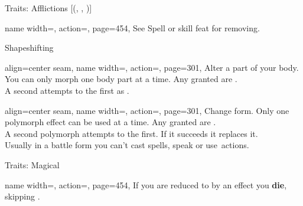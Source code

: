 \begin{PageFront}
\begin{Tables}{\frontTableHeight}
\begin{Table}{Traits: Afflictions }[{(, , )}]
\begin{entry}{}{%
                name width=\conditionLength,%
                action=\Curse,
                page=454,
            }
                See Spell  or  skill feat for removing.
            \end{entry}
        \end{Table}
        \TableSpace
        \begin{Table}{Shapeshifting}
            \begin{entry}{}{%
                align=center seam,
                name width=\conditionLength,%
                action=\Morph,
                page=301,
            }
                Alter a part of your body. You can only morph one body part at a time.
                Any  granted are \Magical. \hfill
                \\
                A second attempts to  the first as \Polymorph.\hfill
            \end{entry}
            \begin{entry}{}{%
                align=center seam,
                name width=\conditionLength,%
                action=\Polymorph,
                page=301,
            }
                Change form.
                Only one polymorph effect can be used at a time.
                Any  granted are \Magical. \hfill
                \\
                A second polymorph attempts to  the first.
                If it succeeds it replaces it. \\
                Usually in a battle form you can't cast spells, speak or use \Manipulate\,actions. \hfill
            \end{entry}
        \end{Table}
    \end{Tables}%
    \begin{Tables}{\frontTableHeight}
        \renewcommand{\TableSpace}{\\\vspace{2mm}\\}%
        \begin{Table}{Traits: Magical}
            \begin{entry}{}{%
                name width=\conditionLength,%
                action=\Death,
                page=454,
            }
                If you are reduced to  \HPs by an effect you \textbf{die}, skipping .

\end{entry}
\end{Table}
\end{Tables}
\end{PageFront}
